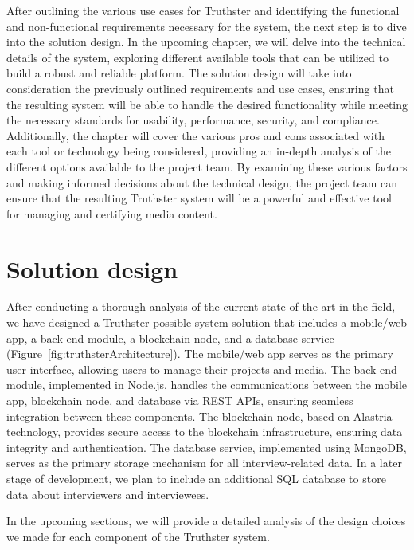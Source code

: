 \documentclass[target=mst,aauheader=]{thud}
\begin{document}
After outlining the various use cases for Truthster and identifying the functional and non-functional requirements necessary for the system, the next step is to dive into the solution design. In the upcoming chapter, we will delve into the technical details of the system, exploring different available tools that can be utilized to build a robust and reliable platform. The solution design will take into consideration the previously outlined requirements and use cases, ensuring that the resulting system will be able to handle the desired functionality while meeting the necessary standards for usability, performance, security, and compliance. Additionally, the chapter will cover the various pros and cons associated with each tool or technology being considered, providing an in-depth analysis of the different options available to the project team. By examining these various factors and making informed decisions about the technical design, the project team can ensure that the resulting Truthster system will be a powerful and effective tool for managing and certifying media content.








\chapter{Solution design}

After conducting a thorough analysis of the current state of the art in the field, we have designed a Truthster possible system solution that includes a mobile/web app, a back-end module, a blockchain node, and a database service (Figure~\ref{fig:truthsterArchitecture}). The mobile/web app serves as the primary user interface, allowing users to manage their projects and media. The back-end module, implemented in Node.js, handles the communications between the mobile app, blockchain node, and database via REST APIs, ensuring seamless integration between these components. The blockchain node, based on Alastria technology, provides secure access to the blockchain infrastructure, ensuring data integrity and authentication. The database service, implemented using MongoDB, serves as the primary storage mechanism for all interview-related data. In a later stage of development, we plan to include an additional SQL database to store data about interviewers and interviewees.\par
In the upcoming sections, we will provide a detailed analysis of the design choices we made for each component of the Truthster system.
\end{document}
